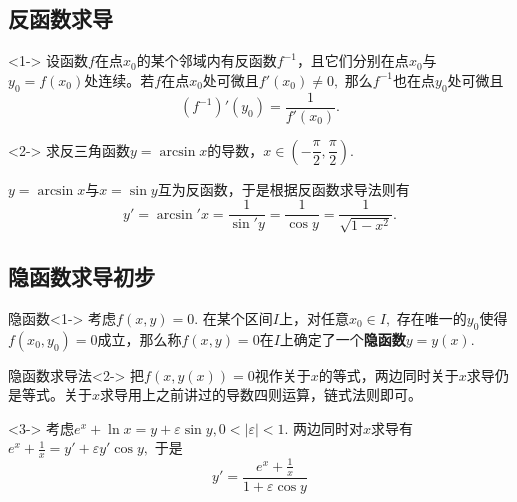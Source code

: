 
\subsection{反函数求导}


\begin{frame}

\begin{thm}<1->
设函数$f$在点$x_0$的某个邻域内有反函数$f^{-1}$，且它们分别在点$x_0$与$y_0=f(x_0)$处连续。若$f$在点$x_0$处可微且$f'(x_0) \neq 0,$ 那么$f^{-1}$也在点$y_0$处可微且
\[(f^{-1})'(y_0) = \dfrac{1}{f'(x_0)}.\]
\end{thm}

\begin{eg}<2->
\centering
求反三角函数$y = \arcsin x$的导数，$x\in(-\dfrac{\pi}{2}, \dfrac{\pi}{2}).$
\end{eg}

\pause

$y = \arcsin x$与$x = \sin y$互为反函数，于是根据反函数求导法则有
\[y' =  \arcsin' x = \dfrac{1}{\sin' y} = \dfrac{1}{\cos y} = \dfrac{1}{\sqrt{1-x^2}}.\]


\end{frame}


\subsection{隐函数求导初步}


\begin{frame}

\begin{block}{隐函数}<1->
考虑$f(x,y) = 0.$ 在某个区间$I$上，对任意$x_0\in I,$ 存在唯一的$y_0$使得$f(x_0,y_0) = 0$成立，那么称$f(x,y) = 0$在$I$上确定了一个{\bfseries 隐函数}$y = y(x).$
\end{block}

\begin{block}{隐函数求导法}<2->
把$f(x,y(x)) = 0$视作关于$x$的等式，两边同时关于$x$求导仍是等式。关于$x$求导用上之前讲过的导数四则运算，链式法则即可。
\end{block}

\begin{eg}<3->
考虑$e^x + \ln x = y + \varepsilon \sin y, 0 < |\varepsilon| < 1.$ 两边同时对$x$求导有$e^x + \frac{1}{x} = y' + \varepsilon y'\cos y,$ 于是
\[y' = \dfrac{e^x + \frac{1}{x}}{1+\varepsilon\cos y}\]
\end{eg}

\end{frame}


